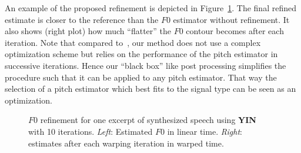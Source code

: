 An example of the proposed refinement is depicted in Figure~\ref{fig:teaser_refined}. The final refined estimate is closer to the reference than the $F0$ estimator without refinement. It also shows (right plot) how much ``flatter'' the $F0$ contour becomes after each iteration.
Note that compared to~\cite{resch07}, our method does not use a complex optimization scheme but relies on the performance of the pitch estimator in successive iterations. Hence our ``black box'' like post processing simplifies the procedure such that it can be applied to any pitch estimator. That way the selection of a pitch estimator which best fits to the signal type can be seen as an optimization.

\begin{figure}[t]
\centering
{}
\caption{$F0$ refinement for one excerpt of synthesized speech using \textbf{YIN}~\cite{decheveigne02} with 10 iterations. \emph{Left}: Estimated $F0$ in linear time. \emph{Right}: estimates after each warping iteration in warped time.}
\label{fig:teaser_refined}
\end{figure}

